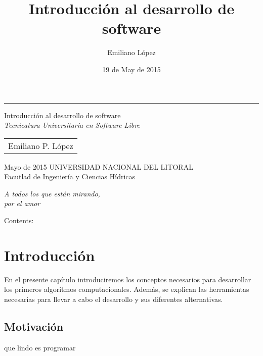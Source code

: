 \documentclass[a4paper,12pt,spanish]{sphinxmanual}
\title{Introducción al desarrollo de software}
\date{19 de May de 2015}
\author{Emiliano López}
\newcommand{\sphinxlogo}{}
\begin{document}

\begin{titlepage}%
    \let\footnotesize\small
    \let\footnoterule\relax
    \rule{\textwidth}{1pt}%
    \begin{flushright}%
      \sphinxlogo%
      \vspace{15 mm}
      {\rm\Huge Introducción al desarrollo de software\\ }
      {\em\large Tecnicatura Universitaria en Software Libre}
      \vfill
      {
        \begin{tabular}[t]{c}
          \large Emiliano P. López
        \end{tabular}
        \par}
      \vfill\vfill
      {\large
        Mayo de 2015
       \vfill
       UNIVERSIDAD NACIONAL DEL LITORAL\\
          Facutlad de Ingeniería y Ciencias Hídricas\\
      }%
    \end{flushright}%
  \end{titlepage}%
  \cleardoublepage%
  \label{pre:dedication}
  \vspace*{\fill}
  \begin{flushright}
    \emph{A todos los que están mirando,\\por el amor}
  \end{flushright}
  \vspace{\fill}

\tableofcontents
{}\label{index::doc}


Contents:


\chapter{Introducción}
\label{Unidad01:introduccion}\label{Unidad01::doc}\label{Unidad01:introduccion-al-desarrollo-de-software}
En el presente capítulo introduciremos los conceptos necesarios para
desarrollar los primeros algoritmos computacionales. Además, se explican
las herramientas necesarias para llevar a cabo el desarrollo y sus
diferentes alternativas.


\section{Motivación}
\label{Unidad01:motivacion}
que lindo es programar
\end{document}
